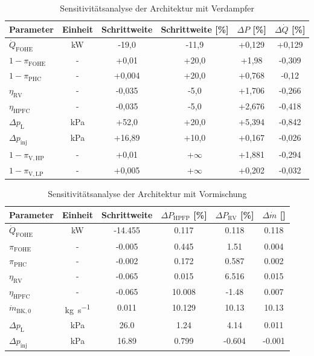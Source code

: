 \begin{table}[ht]
    \centering
	\caption{Sensitivitätsanalyse der Architektur mit Verdampfer}
	\begin{tabular} {|l|c|c|c|c|c|} \hline%
		Parameter & Einheit & Schrittweite & Schrittweite [\%] & $ \Delta P$ [\%] & $ \Delta \dot{Q}$ [\%] \\ \hline\hline%
$\dot{Q}_\mathrm{FOHE}$ & \si{\kilo\W} & -19,0 & -11,9 & +0,129 & +0,129 \\ \hline 
$1-\pi_\mathrm{FOHE}$ & - & +0,01 & +20,0 & +1,98 & -0,309 \\ \hline 
$1-\pi_\mathrm{PHC}$ & - & +0,004 & +20,0 & +0,768 & -0,12 \\ \hline 
$\eta_\mathrm{RV}$ & - & -0,035 & -5,0 & +1,706 & -0,266 \\ \hline 
$\eta_\mathrm{HPFC}$ & - & -0,035 & -5,0 & +2,676 & -0,418 \\ \hline
$\Delta p_\mathrm{L}$ & \si{\kilo\Pa} & +52,0 & +20,0 & +5,394 & -0,842 \\ \hline 
$\Delta p_\mathrm{inj}$ & \si{\kilo\Pa} & +16,89 & +10,0 & +0,167 & -0,026 \\ \hline 
$1-\pi_\mathrm{V, HP}$ & - & +0,01 & +$\infty$ & +1,881 & -0,294 \\ \hline 
$1-\pi_\mathrm{V, LP}$ & - & +0,005 & +$\infty$ & +0,202 & -0,032 \\ \hline 


	\end{tabular}	
    \label{Tab:sensafter}%
\end{table}
\FloatBarrier 



\begin{table}[ht]
    \centering
	\caption{Sensitivitätsanalyse der Architektur mit Vormischung}
	\begin{tabular} {|l|c|c|c|c|c|} \hline%
		Parameter & Einheit & Schrittweite & $ \Delta P_\mathrm{HPFP}$ [\%] & $ \Delta P_\mathrm{RV}$ [\%] & $ \Delta \dot{m}$ [\textperthousand] \\ \hline\hline%
$\dot{Q}_\mathrm{FOHE}$ & \si{\kilo\W} & -14.455 & 0.117 & 0.118 & 0.118 \\ \hline 
$\pi_\mathrm{FOHE}$ & - & -0.005 & 0.445 & 1.51 & 0.004 \\ \hline 
$\pi_\mathrm{PHC}$ & - & -0.002 & 0.172 & 0.587 & 0.002 \\ \hline 
$\eta_\mathrm{RV}$ & - & -0.065 & 0.015 & 6.516 & 0.015 \\ \hline 
$\eta_\mathrm{HPFC}$ & - & -0.065 & 10.008 & -1.48 & 0.007 \\ \hline 
$\dot{m}_\mathrm{BK,0}$ & \si{\kg\per\s} & 0.011 & 10.129 & 10.13 & 10.13 \\ \hline 
$\Delta p_\mathrm{L}$ & \si{\kilo\Pa} & 26.0 & 1.24 & 4.14 & 0.011 \\ \hline 
$\Delta p_\mathrm{inj}$ & \si{\kilo\Pa} & 16.89 & 0.799 & -0.604 & -0.001 \\ \hline 


	\end{tabular}	
    \label{Tab:sensdual}%
\end{table}
\FloatBarrier 


